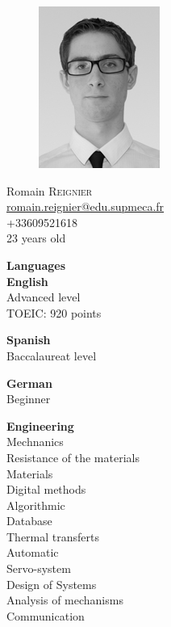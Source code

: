 \documentclass[a4paper,12pt,final]{memoir}
\newcommand{\SmallSep}{\vspace{0.5em}}
\newcommand{\SkillSection}[1]
	{\small{\textbf{#1\\}}\normalfont\footnotesize}
\newcommand{\SkillItem}[1]
	{\textbf{\color{RoyalBlue} #1}\normalfont\\}
\begin{document}
\begin{figure}
	\hfill
	\includegraphics[width=0.6\columnwidth]{IMG_7936-Modifier_cv}
	\vspace{-7cm}
\end{figure}

\begin{flushright}\small
	Romain \textsc{Reignier} \\
	\url{romain.reignier@edu.supmeca.fr}  \\
	+33609521618 \\
	23 years old
\end{flushright}\normalsize

\SkillSection{Languages}
\SkillItem{English}
Advanced level\\
TOEIC: 920 points\\
\SmallSep

\SkillItem{Spanish}
Baccalaureat level
\SmallSep

\SkillItem{German}
Beginner
\SmallSep

\SkillSection{Engineering}
Mechnanics\\
Resistance of the materials\\
Materials\\
Digital methods\\
Algorithmic\\
Database\\
Thermal transferts\\
Automatic\\
Servo-system\\
Design of Systems\\
Analysis of mechanisms\\
Communication\\
\SmallSep
\end{document}
